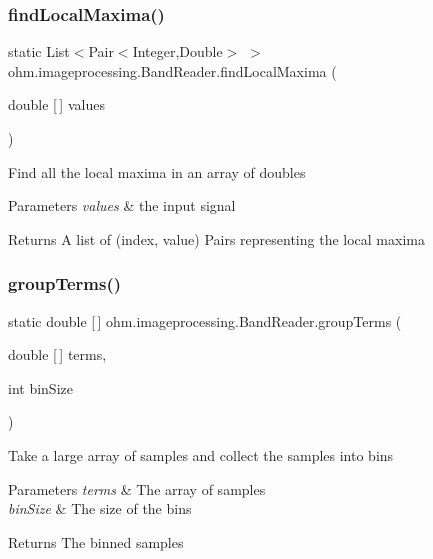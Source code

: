 \subsubsection{\texorpdfstring{find\+Local\+Maxima()}{findLocalMaxima()}}
{\footnotesize\ttfamily static List$<$Pair$<$Integer,Double$>$ $>$ ohm.\+imageprocessing.\+Band\+Reader.\+find\+Local\+Maxima (\begin{DoxyParamCaption}\item[{double \mbox{[}$\,$\mbox{]}}]{values }\end{DoxyParamCaption})\hspace{0.3cm}{\ttfamily [static]}}

Find all the local maxima in an array of doubles 
\begin{DoxyParams}{Parameters}
{\em values} & the input signal \\
\hline
\end{DoxyParams}
\begin{DoxyReturn}{Returns}
A list of (index, value) Pairs representing the local maxima 
\end{DoxyReturn}
\hypertarget{classohm_1_1imageprocessing_1_1_band_reader_af0fe7156595bf275194c8785477ecd71}{}\label{classohm_1_1imageprocessing_1_1_band_reader_af0fe7156595bf275194c8785477ecd71} 
\subsubsection{\texorpdfstring{group\+Terms()}{groupTerms()}}
{\footnotesize\ttfamily static double \mbox{[}$\,$\mbox{]} ohm.\+imageprocessing.\+Band\+Reader.\+group\+Terms (\begin{DoxyParamCaption}\item[{double \mbox{[}$\,$\mbox{]}}]{terms,  }\item[{int}]{bin\+Size }\end{DoxyParamCaption})\hspace{0.3cm}{\ttfamily [static]}}

Take a large array of samples and collect the samples into bins 
\begin{DoxyParams}{Parameters}
{\em terms} & The array of samples \\
\hline
{\em bin\+Size} & The size of the bins \\
\hline
\end{DoxyParams}
\begin{DoxyReturn}{Returns}
The binned samples 
\end{DoxyReturn}
\hypertarget{classohm_1_1imageprocessing_1_1_band_reader_a5a853fa56348caf878ed0fc9c7e0ccaa}{}\label{classohm_1_1imageprocessing_1_1_band_reader_a5a853fa56348caf878ed0fc9c7e0ccaa} 
